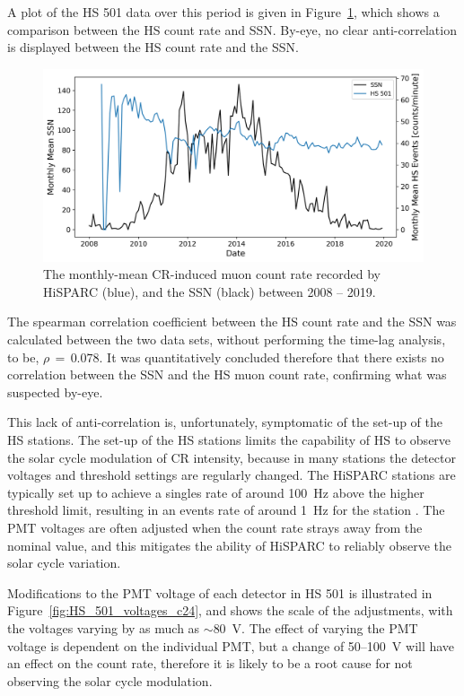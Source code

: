 A plot of the HS 501 data over this period is given in Figure~\ref{fig:HS_SSN_timeseries}, which shows a comparison between the HS count rate and SSN. By-eye, no clear anti-correlation is displayed between the HS count rate and the SSN.

\begin{figure}[ht!]
	\includegraphics[width=\columnwidth]{HS_501_vs_SSN_c24.png}
	\caption{The monthly-mean CR-induced muon count rate recorded by HiSPARC (blue), and the SSN (black) between 2008 -- 2019.}
	\label{fig:HS_SSN_timeseries}
\end{figure}

The spearman correlation coefficient between the HS count rate and the SSN was calculated between the two data sets, without performing the time-lag analysis, to be, $\rho\,=\,0.078$. It was quantitatively concluded therefore that there exists no correlation between the SSN and the HS muon count rate, confirming what was suspected by-eye.

This lack of anti-correlation is, unfortunately, symptomatic of the set-up of the HS stations. The set-up of the HS stations limits the capability of HS to observe the solar cycle modulation of CR intensity, because in many stations the detector voltages and threshold settings are regularly changed. The HiSPARC stations are typically set up to achieve a singles rate of around 100~Hz above the higher threshold limit, resulting in an events rate of around 1~Hz for the station \citep{fokkema_hisparc_2012}. The PMT voltages are often adjusted when the count rate strays away from the nominal value, and this mitigates the ability of HiSPARC to reliably observe the solar cycle variation. 

Modifications to the PMT voltage of each detector in HS 501 is illustrated in Figure~\ref{fig:HS_501_voltages_c24}, and shows the scale of the adjustments, with the voltages varying by as much as $\sim 80$~V. The effect of varying the PMT voltage is dependent on the individual PMT, but a change of 50--100~V will have an effect on the count rate, therefore it is likely to be a root cause for not observing the solar cycle modulation.

